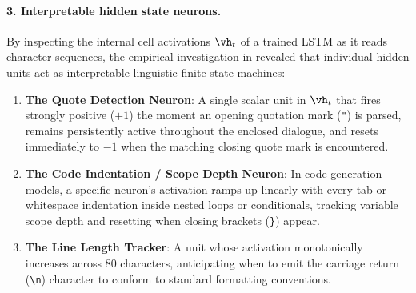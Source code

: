 \documentclass[../../main.tex]{subfiles}
\begin{document}
\paragraph{3. Interpretable hidden state neurons.}
By inspecting the internal cell activations $\vh_t$ of a trained LSTM as it reads character sequences, the empirical investigation in \cite{karpathy2015rnn} revealed that individual hidden units act as interpretable linguistic finite-state machines:
\begin{enumerate}
    \item \textbf{The Quote Detection Neuron}: A single scalar unit in $\vh_t$ that fires strongly positive ($+1$) the moment an opening quotation mark (\texttt{"}) is parsed, remains persistently active throughout the enclosed dialogue, and resets immediately to $-1$ when the matching closing quote mark is encountered.
    \item \textbf{The Code Indentation / Scope Depth Neuron}: In code generation models, a specific neuron's activation ramps up linearly with every tab or whitespace indentation inside nested loops or conditionals, tracking variable scope depth and resetting when closing brackets (\texttt{\}}) appear.
    \item \textbf{The Line Length Tracker}: A unit whose activation monotonically increases across 80 characters, anticipating when to emit the carriage return (\texttt{\textbackslash n}) character to conform to standard formatting conventions.
\end{enumerate}
\end{document}
